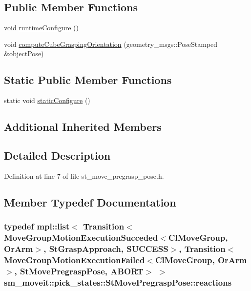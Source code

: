 \subsection*{Public Member Functions}
\begin{DoxyCompactItemize}
\item 
void \hyperlink{structsm__moveit_1_1pick__states_1_1StMovePregraspPose_a2cb64008501b9572198a6767ec1f1fb0}{runtime\+Configure} ()
\item 
void \hyperlink{structsm__moveit_1_1pick__states_1_1StMovePregraspPose_afe2fcedf9034c3c2999e81fb289cf459}{compute\+Cube\+Grasping\+Orientation} (geometry\+\_\+msgs\+::\+Pose\+Stamped \&object\+Pose)
\end{DoxyCompactItemize}
\subsection*{Static Public Member Functions}
\begin{DoxyCompactItemize}
\item 
static void \hyperlink{structsm__moveit_1_1pick__states_1_1StMovePregraspPose_a06a3b0a3c8bd47cf6a6c77e54421d592}{static\+Configure} ()
\end{DoxyCompactItemize}
\subsection*{Additional Inherited Members}


\subsection{Detailed Description}


Definition at line 7 of file st\+\_\+move\+\_\+pregrasp\+\_\+pose.\+h.



\subsection{Member Typedef Documentation}
\subsubsection[{\texorpdfstring{reactions}{reactions}}]{\setlength{\rightskip}{0pt plus 5cm}typedef mpl\+::list$<$ Transition$<${\bf Move\+Group\+Motion\+Execution\+Succeded}$<${\bf Cl\+Move\+Group}, {\bf Or\+Arm}$>$, {\bf St\+Grasp\+Approach}, {\bf S\+U\+C\+C\+E\+SS}$>$, Transition$<${\bf Move\+Group\+Motion\+Execution\+Failed}$<${\bf Cl\+Move\+Group}, {\bf Or\+Arm}$>$, {\bf St\+Move\+Pregrasp\+Pose}, {\bf A\+B\+O\+RT}$>$ $>$ {\bf sm\+\_\+moveit\+::pick\+\_\+states\+::\+St\+Move\+Pregrasp\+Pose\+::reactions}}\hypertarget{structsm__moveit_1_1pick__states_1_1StMovePregraspPose_a24457ed9411566498ea50222265ad652}{}\label{structsm__moveit_1_1pick__states_1_1StMovePregraspPose_a24457ed9411566498ea50222265ad652}


